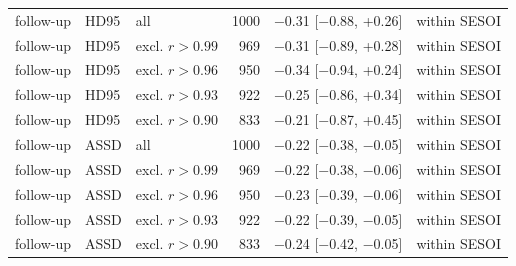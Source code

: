 \begin{tabular}{lllrll}
follow-up & HD95 & all & 1000 & $-$0.31 [$-$0.88, +0.26] & within SESOI \\
follow-up & HD95 & excl. $r>0.99$ & 969 & $-$0.31 [$-$0.89, +0.28] & within SESOI \\
follow-up & HD95 & excl. $r>0.96$ & 950 & $-$0.34 [$-$0.94, +0.24] & within SESOI \\
follow-up & HD95 & excl. $r>0.93$ & 922 & $-$0.25 [$-$0.86, +0.34] & within SESOI \\
follow-up & HD95 & excl. $r>0.90$ & 833 & $-$0.21 [$-$0.87, +0.45] & within SESOI \\
follow-up & ASSD & all & 1000 & $-$0.22 [$-$0.38, $-$0.05] & within SESOI \\
follow-up & ASSD & excl. $r>0.99$ & 969 & $-$0.22 [$-$0.38, $-$0.06] & within SESOI \\
follow-up & ASSD & excl. $r>0.96$ & 950 & $-$0.23 [$-$0.39, $-$0.06] & within SESOI \\
follow-up & ASSD & excl. $r>0.93$ & 922 & $-$0.22 [$-$0.39, $-$0.05] & within SESOI \\
follow-up & ASSD & excl. $r>0.90$ & 833 & $-$0.24 [$-$0.42, $-$0.05] & within SESOI \\
\bottomrule
\end{tabular}
